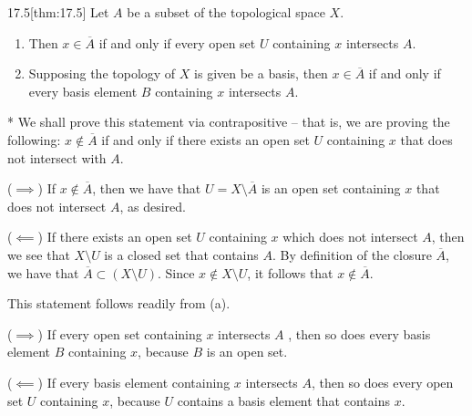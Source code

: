 \begin{thmBox}{17.5}[thm:17.5]
    Let \( A \) be a subset of the topological space \( X \).
    \begin{enumerate}[label = (\alph*)]
        \item Then \( x \in \overline{ A } \) if and only if every open set 
            \( U \) containing \( x \) intersects \( A \).
        \item Supposing the topology of \( X \) is given be a basis, then 
            \( x \in \overline{ A } \) if and only if every basis element 
            \( B \) containing \( x \) intersects \( A \).
    \end{enumerate}

    \baseRule

    \begin{proofBox}*
        We shall prove this statement via contrapositive -- that is, we are 
        proving the following: \( x \notin \overline{ A } \) if and only if 
        there exists an open set \( U \) containing \( x \) that does not 
        intersect with \( A \).

        \baseSkip
        
        (\( \implies \)) If \( x \notin \overline{ A } \), then we have that 
        \( U = X \setminus \overline{ A } \) is an open set containing \( x \) 
        that does not intersect \( A \), as desired.
        
        \baseSkip

        (\( \impliedby \)) If there exists an open set \( U \) containing 
        \( x \) which does not intersect \( A \), then we see that 
        \( X \setminus U \) is a closed set that contains \( A \).
        By definition of the closure \( \overline{ A } \), we have that 
        \( \overline{ A } \subset ( X \setminus U ) \).
        Since \( x \notin X \setminus U \), it follows that \( x \notin 
        \overline{ A } \).

        \baseSkip

        This statement follows readily from (a).

        \baseSkip

        (\( \implies \)) If every open set containing \( x \) intersects \( A \)
        , then so does
        every basis element \( B \) containing \( x \), because \( B \) is 
        an open set.

        \baseSkip

        (\( \impliedby \)) If every basis element containing \( x \) intersects
        \( A \), then so does every open set \( U \) containing \( x \), because
        \( U \) contains a basis element that contains \( x \).
    \end{proofBox}
\end{thmBox}

